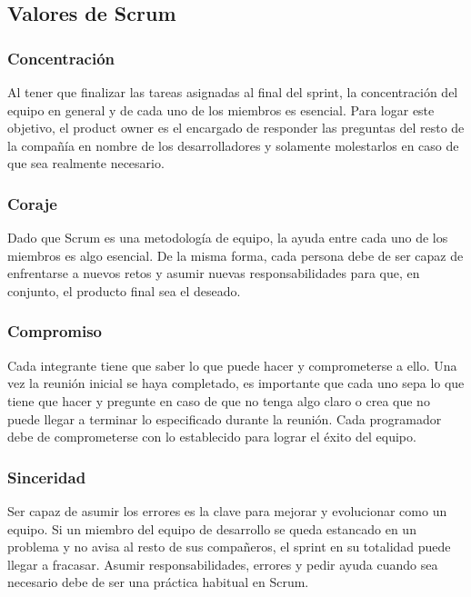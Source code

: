 \subsection{Valores de Scrum}

\subsubsection{Concentración}

Al tener que finalizar las tareas asignadas al final del sprint, la concentración del equipo en general y de cada uno de los miembros es esencial. Para logar este objetivo, el product owner es el encargado de responder las preguntas del resto de la compañía en nombre de los desarrolladores y solamente molestarlos en caso de que sea realmente necesario. 

\subsubsection{Coraje}

Dado que Scrum es una metodología de equipo, la ayuda entre cada uno de los miembros es algo esencial. De la misma forma, cada persona debe de ser capaz de enfrentarse a nuevos retos y asumir nuevas responsabilidades para que, en conjunto, el producto final sea el deseado. 

\subsubsection{Compromiso}

Cada integrante tiene que saber lo que puede hacer y comprometerse a ello. Una vez la reunión inicial se haya completado, es importante que cada uno sepa lo que tiene que hacer y pregunte en caso de que no tenga algo claro o crea que no puede llegar a terminar lo especificado durante la reunión. Cada programador debe de comprometerse con lo establecido para lograr el éxito del equipo.

\subsubsection{Sinceridad}

Ser capaz de asumir los errores es la clave para mejorar y evolucionar como un equipo. Si un miembro del equipo de desarrollo se queda estancado en un problema y no avisa al resto de sus compañeros, el sprint en su totalidad puede llegar a fracasar. Asumir responsabilidades, errores y pedir ayuda cuando sea necesario debe de ser una práctica habitual en Scrum.

